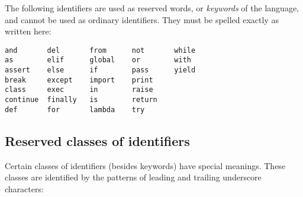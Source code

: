 The following identifiers are used as reserved words, or
\emph{keywords} of the language, and cannot be used as ordinary
identifiers.  They must be spelled exactly as written here:%
%

\begin{verbatim}
and       del       from      not       while    
as        elif      global    or        with     
assert    else      if        pass      yield    
break     except    import    print              
class     exec      in        raise              
continue  finally   is        return             
def       for       lambda    try 
\end{verbatim}





\subsection{Reserved classes of identifiers\label{id-classes}}

Certain classes of identifiers (besides keywords) have special
meanings.  These classes are identified by the patterns of leading and
trailing underscore characters:

